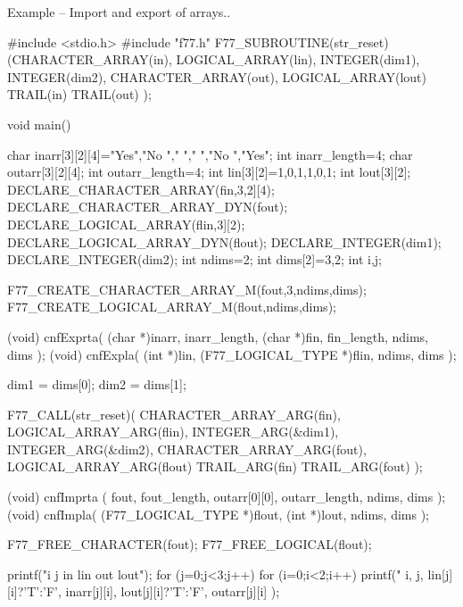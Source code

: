 \documentclass[twoside,11pt,nolof]{starlink}
\newcounter{examples}
\begin{document}
\label{cook_reset}
\begin{center}
Example\latex{~\ref{cook_reset}}
-- Import and export of arrays.\@.
\end{center}
\begin{small}
\begin{terminalv}
#include <stdio.h>
#include "f77.h"
F77_SUBROUTINE(str_reset)(CHARACTER_ARRAY(in), LOGICAL_ARRAY(lin),
                          INTEGER(dim1), INTEGER(dim2),
                          CHARACTER_ARRAY(out), LOGICAL_ARRAY(lout)
                          TRAIL(in) TRAIL(out) );

void main(){
char inarr[3][2][4]={{"Yes","No "},{"   ","   "},{"No ","Yes"}};
int inarr_length=4;
char outarr[3][2][4];
int outarr_length=4;
int lin[3][2]={{1,0},{1,1},{0,1}};
int lout[3][2];
DECLARE_CHARACTER_ARRAY(fin,3,2][4);
DECLARE_CHARACTER_ARRAY_DYN(fout);
DECLARE_LOGICAL_ARRAY(flin,3][2);
DECLARE_LOGICAL_ARRAY_DYN(flout);
DECLARE_INTEGER(dim1);
DECLARE_INTEGER(dim2);
int ndims=2;
int dims[2]={3,2};
int i,j;

   F77_CREATE_CHARACTER_ARRAY_M(fout,3,ndims,dims);
   F77_CREATE_LOGICAL_ARRAY_M(flout,ndims,dims);

   (void) cnfExprta(
      (char *)inarr, inarr_length, (char *)fin, fin_length, ndims, dims );
   (void) cnfExpla( (int *)lin, (F77_LOGICAL_TYPE *)flin, ndims, dims );

   dim1 = dims[0];
   dim2 = dims[1];

   F77_CALL(str_reset)( CHARACTER_ARRAY_ARG(fin), LOGICAL_ARRAY_ARG(flin),
                     INTEGER_ARG(&dim1), INTEGER_ARG(&dim2),
                     CHARACTER_ARRAY_ARG(fout), LOGICAL_ARRAY_ARG(flout)
                     TRAIL_ARG(fin) TRAIL_ARG(fout) );

   (void) cnfImprta
           ( fout, fout_length, outarr[0][0], outarr_length, ndims, dims );
   (void) cnfImpla( (F77_LOGICAL_TYPE *)flout, (int *)lout, ndims, dims );

   F77_FREE_CHARACTER(fout);
   F77_FREE_LOGICAL(flout);

   printf("i j in  lin out lout\n");
   for (j=0;j<3;j++){
      for (i=0;i<2;i++){
         printf("%
            i, j, lin[j][i]?'T':'F', inarr[j][i],
                  lout[j][i]?'T':'F', outarr[j][i] );
      }
   }
}
\end{terminalv}
\end{small}
\end{document}
